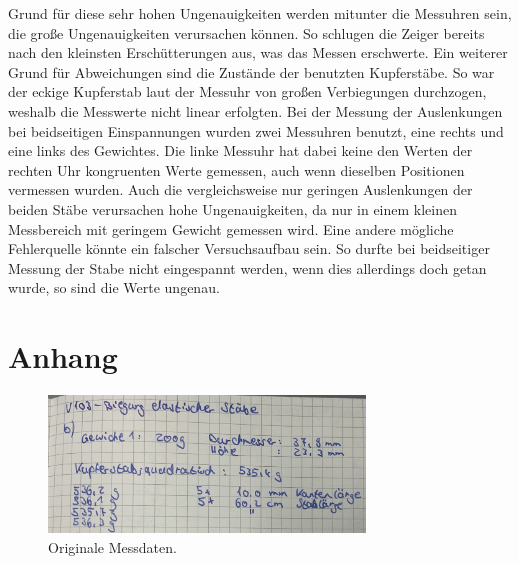 Grund für diese sehr hohen Ungenauigkeiten werden mitunter die Messuhren sein, die große Ungenauigkeiten verursachen können.
So schlugen die Zeiger bereits nach den kleinsten Erschütterungen aus, was das Messen erschwerte. 
Ein weiterer Grund für Abweichungen sind die Zustände der benutzten Kupferstäbe. So war der eckige Kupferstab laut der Messuhr
von großen Verbiegungen durchzogen, weshalb die Messwerte nicht linear erfolgten.
Bei der Messung der Auslenkungen bei beidseitigen Einspannungen wurden zwei Messuhren benutzt, eine rechts und eine links des Gewichtes.
Die linke Messuhr hat dabei keine den Werten der rechten Uhr kongruenten Werte gemessen, auch wenn dieselben Positionen vermessen wurden.
Auch die vergleichsweise nur geringen Auslenkungen der beiden Stäbe verursachen hohe Ungenauigkeiten, da nur in einem
kleinen Messbereich mit geringem Gewicht gemessen wird.
Eine andere mögliche Fehlerquelle könnte ein falscher Versuchsaufbau sein. So durfte bei beidseitiger Messung der Stabe nicht
eingespannt werden, wenn dies allerdings doch getan wurde, so sind die Werte ungenau.


\section{Anhang}
\label{sec:anhang}

\begin{figure}[H]
  \centering
  \includegraphics[width=0.75\textwidth]{Dateien/Bild1.jpeg}
  \caption{Originale Messdaten.}
  \label{fig:daten1}
\end{figure}

